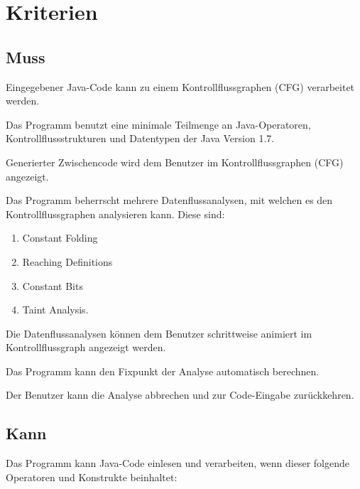 
\section{Kriterien}

\subsection{Muss}

Eingegebener Java-Code kann zu einem Kontrollflussgraphen (CFG) verarbeitet werden.

Das Programm benutzt eine minimale Teilmenge an Java-Operatoren, Kontrollflussstrukturen und Datentypen der Java Version 1.7.

Generierter Zwischencode wird dem Benutzer im Kontrollflussgraphen (CFG) angezeigt.

Das Programm beherrscht mehrere Datenflussanalysen, mit welchen es den Kontrollflussgraphen analysieren kann.
Diese sind:\par
\begin{enumerate}[label=(\alph*)]
\item Constant Folding
\item Reaching Definitions
\item Constant Bits
\item Taint Analysis.
\end{enumerate}

Die Datenflussanalysen können dem Benutzer schrittweise animiert im Kontrollflussgraph angezeigt werden.

Das Programm kann den Fixpunkt der Analyse automatisch berechnen.

Der Benutzer kann die Analyse abbrechen und zur Code-Eingabe zurückkehren.

\subsection{Kann}

Das Programm kann Java-Code einlesen und verarbeiten, wenn dieser folgende Operatoren und Konstrukte beinhaltet:

